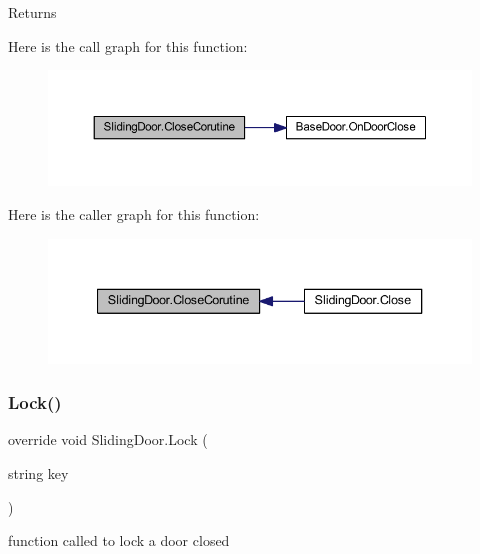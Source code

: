 \begin{DoxyReturn}{Returns}

\end{DoxyReturn}
Here is the call graph for this function\+:\nopagebreak
\begin{figure}[H]
\begin{center}
\leavevmode
\includegraphics[width=350pt]{class_sliding_door_adcfa4000b6eafa6ec8b6ec335dbd5efe_cgraph}
\end{center}
\end{figure}
Here is the caller graph for this function\+:\nopagebreak
\begin{figure}[H]
\begin{center}
\leavevmode
\includegraphics[width=340pt]{class_sliding_door_adcfa4000b6eafa6ec8b6ec335dbd5efe_icgraph}
\end{center}
\end{figure}
\mbox{\label{class_sliding_door_a2b21b6ea3181ac95520e0490c900d1a6}} 
\subsubsection{\texorpdfstring{Lock()}{Lock()}}
{\footnotesize\ttfamily override void Sliding\+Door.\+Lock (\begin{DoxyParamCaption}\item[{string}]{key }\end{DoxyParamCaption})\hspace{0.3cm}{\ttfamily [virtual]}}



function called to lock a door closed 


